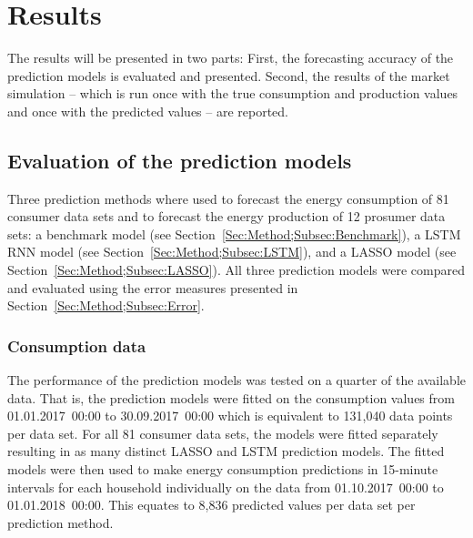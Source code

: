 
\section{Results}\label{Sec:Results}

The results will be presented in two parts: First, the forecasting accuracy of the prediction models is evaluated and presented. Second, the results of the market simulation -- which is run once with the true consumption and production values and once with the predicted values -- are reported.



\subsection{Evaluation of the prediction models}\label{Sec:Results;Subsec:Forecast}

Three prediction methods where used to forecast the energy consumption of 81 consumer data sets and to forecast the energy production of 12 prosumer data sets: a benchmark model (see Section~\ref{Sec:Method;Subsec:Benchmark}), a LSTM RNN model (see Section~\ref{Sec:Method;Subsec:LSTM}), and a LASSO model (see Section~\ref{Sec:Method;Subsec:LASSO}). All three prediction models were compared and evaluated using the error measures presented in Section~\ref{Sec:Method;Subsec:Error}.


\subsubsection{Consumption data}

The performance of the prediction models was tested on a quarter of the available data. That is, the prediction models were fitted on the consumption values from 01.01.2017~00:00 to 30.09.2017~00:00 which is equivalent to 131,040 data points per data set. For all 81 consumer data sets, the models were fitted separately resulting in as many distinct LASSO and LSTM prediction models. The fitted models were then used to make energy consumption predictions in 15-minute intervals for each household individually on the data from 01.10.2017~00:00 to 01.01.2018~00:00. This equates to 8,836 predicted values per data set per prediction method.


